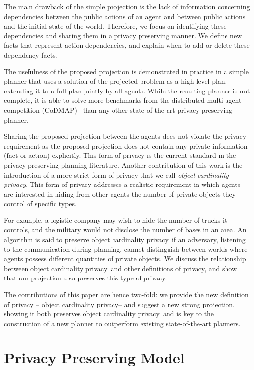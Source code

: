 \documentclass[letterpaper]{article}
\newcommand\cprivacy{object cardinality privacy}
\theoremstyle{definition}
\begin{document}
The main drawback of the simple projection is the lack of information concerning dependencies between the public actions of an agent and between public actions and the initial state of the world.
Therefore, we focus on identifying these dependencies and sharing them in a privacy preserving manner. We define new facts that represent action dependencies, and explain when to add or delete these dependency facts.


The usefulness of the proposed projection is demonstrated in practice in a simple planner that uses a solution of the projected problem as a high-level plan, extending it to a full plan jointly by all agents. While the resulting planner is not complete, it is able to solve more benchmarks from the distributed multi-agent competition (CoDMAP)~\cite{vstolba2015competition} than any other state-of-the-art privacy preserving planner.

Sharing the proposed projection between the agents does not violate the privacy requirement as the proposed projection does not contain any private information (fact or action) explicitly. This form of privacy is the current standard in the privacy preserving planning literature.
Another contribution of this work is the introduction of a more strict form of privacy that we call {\em \cprivacy }. This form of privacy addresses a realistic requirement in which agents are interested in hiding from other agents the number of private objects they control of specific types.

For example, a logistic company may wish to hide the number of trucks it controls, and the military would not disclose the number of bases in an area. An algorithm is said to preserve \cprivacy\ if an adversary, listening to the communication during planning, cannot distinguish between worlds where agents possess different quantities of private objects. We discuss the relationship between \cprivacy\ and other definitions of privacy, and show that our projection also preserves this type of privacy. %

The contributions of this paper are hence two-fold: we provide the new definition of privacy -- \cprivacy -- and suggest a new strong projection, showing it both preserves \cprivacy\ and is key to the construction of a new planner to outperform existing state-of-the-art planners.

\section{Privacy Preserving Model}
\end{document}

